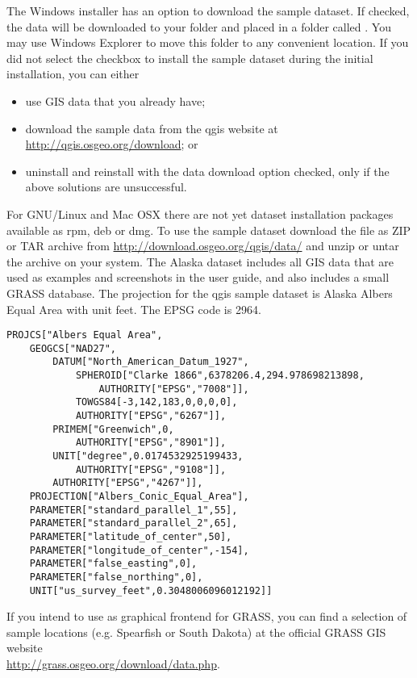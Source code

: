 \win The Windows installer has an option to download the \qg sample dataset.
If checked, the data will be downloaded to your 
folder and placed in a folder called . 
You may use Windows Explorer to move this folder to any convenient location.
If you did not select the checkbox to install the sample dataset
during the initial \qg installation, you can either
\begin{itemize}[label=--]
\item use GIS data that you already have;
\item download the sample data from the qgis website at \url{http://qgis.osgeo.org/download}; or
\item uninstall \qg and reinstall with the data download option checked, only if 
the above solutions are unsuccessful.
\end{itemize}

\nix \osx For GNU/Linux and Mac OSX there are not yet dataset installation
packages available as rpm, deb or dmg. To use the sample dataset download the
file  as ZIP or TAR archive from
\url{http://download.osgeo.org/qgis/data/} and unzip or untar the archive on
your system. The Alaska dataset includes all GIS data that are used as
examples and screenshots in the user guide, and also includes a small GRASS
database. The projection for the qgis sample dataset is Alaska Albers Equal
Area with unit feet. The EPSG code is 2964.

\begin{verbatim}
PROJCS["Albers Equal Area",
    GEOGCS["NAD27",
        DATUM["North_American_Datum_1927",
            SPHEROID["Clarke 1866",6378206.4,294.978698213898,
                AUTHORITY["EPSG","7008"]],
            TOWGS84[-3,142,183,0,0,0,0],
            AUTHORITY["EPSG","6267"]],
        PRIMEM["Greenwich",0,
            AUTHORITY["EPSG","8901"]],
        UNIT["degree",0.0174532925199433,
            AUTHORITY["EPSG","9108"]],
        AUTHORITY["EPSG","4267"]],
    PROJECTION["Albers_Conic_Equal_Area"],
    PARAMETER["standard_parallel_1",55],
    PARAMETER["standard_parallel_2",65],
    PARAMETER["latitude_of_center",50],
    PARAMETER["longitude_of_center",-154],
    PARAMETER["false_easting",0],
    PARAMETER["false_northing",0],
    UNIT["us_survey_feet",0.3048006096012192]]
\end{verbatim}

If you intend to use \qg as graphical frontend for GRASS, you can find a
selection of sample locations (e.g. Spearfish or South Dakota) at the
official GRASS GIS website \\
\url{http://grass.osgeo.org/download/data.php}. 

